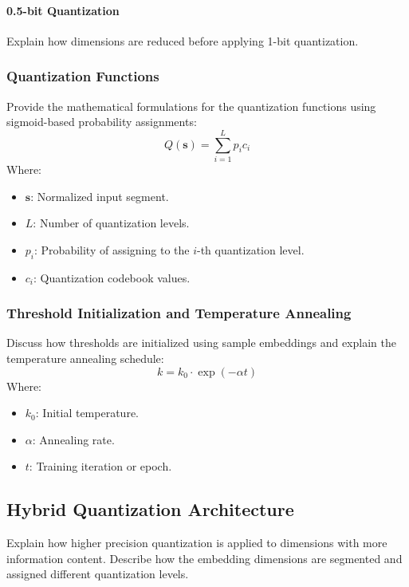 \paragraph{0.5-bit Quantization}  
Explain how dimensions are reduced before applying 1-bit quantization.  
  
\subsubsection{Quantization Functions}  
Provide the mathematical formulations for the quantization functions using sigmoid-based probability assignments:  
\begin{equation}  
Q(\mathbf{s}) = \sum_{i=1}^{L} p_i c_i  
\end{equation}  
Where:  
\begin{itemize}  
    \item $\mathbf{s}$: Normalized input segment.  
    \item $L$: Number of quantization levels.  
    \item $p_i$: Probability of assigning to the $i$-th quantization level.  
    \item $c_i$: Quantization codebook values.  
\end{itemize}  
  
\subsubsection{Threshold Initialization and Temperature Annealing}  
Discuss how thresholds are initialized using sample embeddings and explain the temperature annealing schedule:  
\begin{equation}  
k = k_0 \cdot \exp(-\alpha t)  
\end{equation}  
Where:  
\begin{itemize}  
    \item $k_0$: Initial temperature.  
    \item $\alpha$: Annealing rate.  
    \item $t$: Training iteration or epoch.  
\end{itemize}  
  
\subsection{Hybrid Quantization Architecture}  
\label{sec:hybrid_quantization}  
Explain how higher precision quantization is applied to dimensions with more information content. Describe how the embedding dimensions are segmented and assigned different quantization levels.  
  
